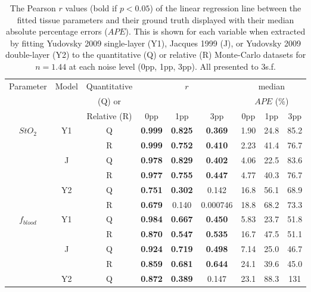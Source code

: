 \begin{table}[h!]
    \centering
    \caption{The Pearson $r$ values (bold if $p<0.05$) of the linear regression line between the fitted tissue parameters and their ground truth displayed with their median absolute percentage errors ($APE$). This is shown for each variable when extracted by fitting Yudovsky 2009 single-layer (Y1), Jacques 1999 (J), or Yudovsky 2009 double-layer (Y2) to the quantitative (Q) or relative (R) Monte-Carlo datasets for $n=1.44$ at each noise level (0pp, 1pp, 3pp). All presented to 3s.f.}
    \begin{tabular}{|ccc|ccc|ccc|}
        \hline
        Parameter & Model & Quantitative & \multicolumn{3}{c}{$r$} & \multicolumn{3}{|c|}{median} \\
        & & (Q) or & \multicolumn{3}{c}{} & \multicolumn{3}{|c|}{$APE$ (\%)} \\
        & & Relative (R) & 0pp & 1pp & 3pp & 0pp & 1pp & 3pp \\
        \hline
        \multirow{6}{*}{$StO_2$} & \multirow{2}{*}{Y1} & Q & \textbf{0.999} & \textbf{0.825} & \textbf{0.369} & 1.90 & 24.8 & 85.2 \\
        & & R & \textbf{0.999} & \textbf{0.752} & \textbf{0.410} & 2.23 & 41.4 & 76.7 \\
        \cline{2-9}
        & \multirow{2}{*}{J} & Q & \textbf{0.978} & \textbf{0.829} & \textbf{0.402} & 4.06 & 22.5 & 83.6 \\
        & & R & \textbf{0.977} & \textbf{0.755} & \textbf{0.447} & 4.77 & 40.3 & 76.7 \\
        \cline{2-9}
        & \multirow{2}{*}{Y2} & Q & \textbf{0.751} & \textbf{0.302} & 0.142 & 16.8 & 56.1 & 68.9 \\
        & & R & \textbf{0.679} & 0.140 & 0.000746 & 18.8 & 68.2 & 73.3 \\
        \hline
        \multirow{6}{*}{$f_{blood}$} & \multirow{2}{*}{Y1} & Q & \textbf{0.984} & \textbf{0.667} & \textbf{0.450} & 5.83 & 23.7 & 51.8\\
        & & R & \textbf{0.870} & \textbf{0.547} & \textbf{0.535} & 16.7 & 47.5 & 51.1\\
        \cline{2-9}
        & \multirow{2}{*}{J} & Q & \textbf{0.924} & \textbf{0.719} & \textbf{0.498} & 7.14 & 25.0 & 46.7 \\
        & & R & \textbf{0.859} & \textbf{0.681} & \textbf{0.644} & 24.1 & 39.6 & 45.0 \\
        \cline{2-9}
        & \multirow{2}{*}{Y2} & Q & \textbf{0.872} & \textbf{0.389} & 0.147 & 23.1 & 88.3 & 131 \\

\end{tabular}
\end{table}
